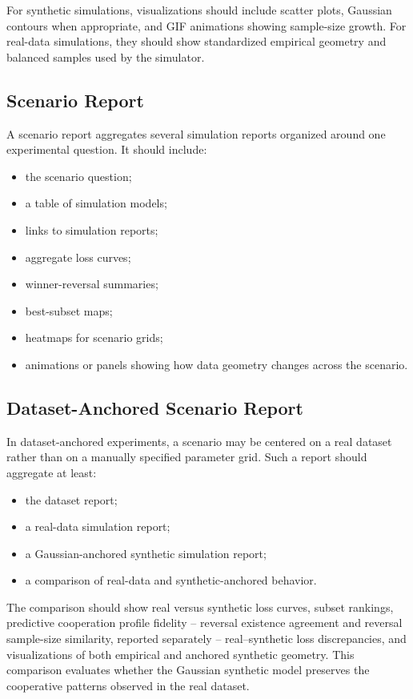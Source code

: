 \documentclass[11pt,a4paper]{article}
\begin{document}
For synthetic simulations, visualizations should include scatter plots, Gaussian contours when appropriate, and GIF animations showing sample-size growth. For real-data simulations, they should show standardized empirical geometry and balanced samples used by the simulator.

\subsection{Scenario Report}

A scenario report aggregates several simulation reports organized around one experimental question. It should include:
\begin{itemize}
    \item the scenario question;
    \item a table of simulation models;
    \item links to simulation reports;
    \item aggregate loss curves;
    \item winner-reversal summaries;
    \item best-subset maps;
    \item heatmaps for scenario grids;
    \item animations or panels showing how data geometry changes across the scenario.
\end{itemize}

\subsection{Dataset-Anchored Scenario Report}

In dataset-anchored experiments, a scenario may be centered on a real dataset rather than on a manually specified parameter grid. Such a report should aggregate at least:
\begin{itemize}
    \item the dataset report;
    \item a real-data simulation report;
    \item a Gaussian-anchored synthetic simulation report;
    \item a comparison of real-data and synthetic-anchored behavior.
\end{itemize}

The comparison should show real versus synthetic loss curves, subset rankings, predictive cooperation profile fidelity -- reversal existence agreement and reversal sample-size similarity, reported separately -- real--synthetic loss discrepancies, and visualizations of both empirical and anchored synthetic geometry. This comparison evaluates whether the Gaussian synthetic model preserves the cooperative patterns observed in the real dataset.
\end{document}
